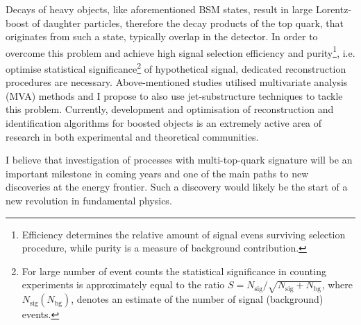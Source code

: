 \textcolor{\mycolor}{
Decays of heavy objects, like  aforementioned BSM states, result in large Lorentz-boost of daughter particles, therefore the decay products of the top quark, that originates from such a state, typically overlap in the detector. In order to overcome this problem and achieve high signal selection efficiency and purity\footnote{Efficiency determines the relative amount of signal evens surviving selection procedure, while purity is a measure of background contribution.}, i.e. optimise statistical significance\footnote{For large number of event counts the statistical significance in counting experiments is approximately equal to the ratio $S=N_{\mathrm{sig}}/\sqrt{N_{\mathrm{sig}}+N_{\mathrm{bg}}}$, where $N_{\mathrm{sig}}\left(N_{\mathrm{bg}}\right)$, denotes an estimate of the number of signal (background) events.} of hypothetical signal, dedicated reconstruction procedures are necessary. Above-mentioned studies utilised multivariate analysis (MVA) methods and I propose to also use jet-substructure techniques to tackle this problem. Currently, development and optimisation of reconstruction and identification algorithms for boosted objects is an extremely active area of research in both experimental and theoretical communities.}

\textcolor{\mycolor}{
I believe that investigation of processes with multi-top-quark signature will be an important milestone in coming years and one of the main paths to new discoveries at the energy frontier. Such a discovery would likely be the start of a new revolution in fundamental physics. }